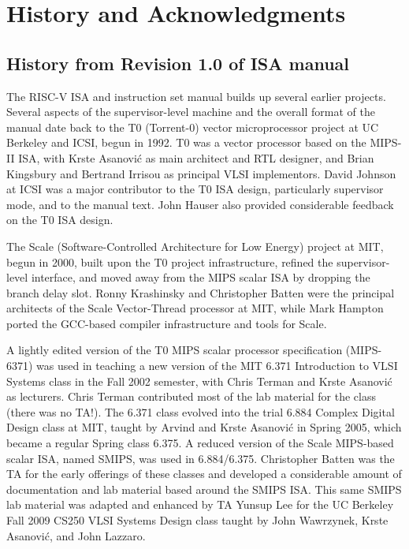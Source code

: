 \chapter{History and Acknowledgments}
\label{history}

\section{History from Revision 1.0 of ISA manual}

The RISC-V ISA and instruction set manual builds up several earlier
projects.  Several aspects of the supervisor-level machine and the
overall format of the manual date back to the T0 (Torrent-0) vector
microprocessor project at UC Berkeley and ICSI, begun in 1992.  T0 was
a vector processor based on the MIPS-II ISA, with Krste Asanovi\'{c}
as main architect and RTL designer, and Brian Kingsbury and Bertrand
Irrisou as principal VLSI implementors.  David Johnson at ICSI was a
major contributor to the T0 ISA design, particularly supervisor mode,
and to the manual text.  John Hauser also provided considerable
feedback on the T0 ISA design.

The Scale (Software-Controlled Architecture for Low Energy) project at
MIT, begun in 2000, built upon the T0 project infrastructure, refined
the supervisor-level interface, and moved away from the MIPS scalar
ISA by dropping the branch delay slot.  Ronny Krashinsky and
Christopher Batten were the principal architects of the Scale
Vector-Thread processor at MIT, while Mark Hampton ported the
GCC-based compiler infrastructure and tools for Scale.

A lightly edited version of the T0 MIPS scalar processor specification
(MIPS-6371) was used in teaching a new version of the MIT 6.371
Introduction to VLSI Systems class in the Fall 2002 semester, with
Chris Terman and Krste Asanovi\'{c} as lecturers.  Chris Terman
contributed most of the lab material for the class (there was no
TA!). The 6.371 class evolved into the trial 6.884 Complex Digital
Design class at MIT, taught by Arvind and Krste Asanovi\'{c} in Spring
2005, which became a regular Spring class 6.375.  A reduced version of
the Scale MIPS-based scalar ISA, named SMIPS, was used in 6.884/6.375.
Christopher Batten was the TA for the early offerings of these classes
and developed a considerable amount of documentation and lab material
based around the SMIPS ISA.  This same SMIPS lab material was adapted
and enhanced by TA Yunsup Lee for the UC Berkeley Fall 2009 CS250 VLSI
Systems Design class taught by John Wawrzynek, Krste Asanovi\'{c}, and
John Lazzaro.

